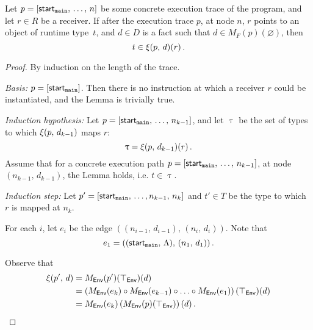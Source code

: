\begin{lemma}\label{lem:sound1}
Let $p=[\textsf{start}_\texttt{main},\,\dots,\,n]$ be some concrete execution trace of the program, and let $r\in R$ be a receiver. If after the execution trace $p$, at node $n$, $r$ points to an object of runtime type~$t$, and $d\in D$ is a fact such that $d\in M_F(p)(\varnothing)$, then
  \begin{equation}
    t\in\xi(p,\,d)(r)\,.
  \end{equation}
\end{lemma}
\begin{proof}
  By induction on the length of the trace.
  
  \textit{Basis:} $p=[\textsf{start}_\texttt{main}]$. Then there is no instruction at which a receiver $r$ could be instantiated, and the Lemma is trivially true.    

  \textit{Induction hypothesis:} Let $p=[\textsf{start}_\texttt{main},\,\dots,\,n_{k-1}]$, and let $\uptau$ be the set of types to which $\xi(p,\,d_{k-1})$ maps $r$:
  \begin{equation}
    \uptau=\xi(p,\,d_{k-1})(r)\,.
  \end{equation}
  Assume that for a concrete execution path $p=[\textsf{start}_\texttt{main},\,\dots,\,n_{k-1}]$, at node $(n_{k-1},\,d_{k-1})$, the Lemma holds, i.e. $t\in\uptau$.
  
  \textit{Induction step:} Let $p'=[\textsf{start}_\texttt{main},\,\dots,n_{k-1},\,n_k]$ and $t'\in T$ be the type to which $r$ is mapped at $n_k$.
  
  For each $i$, let $e_i$ be the edge $((n_{i-1},\,d_{i-1}),\,(n_i,\,d_i))$. Note that $$e_1=((\textsf{start}_\texttt{main},\,\Lambda),\,(n_1,\,d_1))\,.$$  

  Observe that
  \begin{align*}
    \xi(p',\,d)
    &=M_\textsf{Env}(p')(\top_\textsf{Env})(d)\\
    &=\left(M_\textsf{Env}(e_k)\circ M_\textsf{Env}(e_{k-1})\circ\ldots\circ M_\textsf{Env}(e_1)\right)(\top_\textsf{Env})(d)\\
    &=M_\textsf{Env}(e_k)\left(M_\textsf{Env}(p)(\top_\textsf{Env})\right)(d)\,.
  \end{align*}
  

\end{proof}
